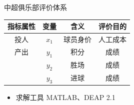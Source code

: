 \documentclass[]{beamer}
\begin{document}
\begin{frame}{中超俱乐部评价体系}
    \begin{table}
        \begin{tabular}{cccc}
            \toprule
            指标属性 & 变量 & 含义 & 评价目的 \\
            \midrule
            投人 & $x_1$ & 球员身价 & 人工成本 \\
            \midrule
            产出 & $y_1$ & 积分 & 成绩 \\
            & $y_2$ & 胜场 & 成绩 \\
            & $y_3$ & 进球 & 成绩 \\
            \bottomrule
        \end{tabular}
    \end{table}
    \begin{itemize}
        \item 求解工具 MATLAB、DEAP 2.1
    \end{itemize}
\end{frame}
\end{document}

